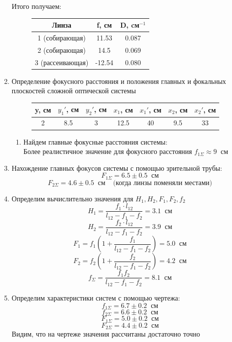 \documentclass[a4paper,12pt]{article}
\begin{document}
\begin{enumerate}
Итого получаем:
\begin{figure}[h!]
\centering
\begin{tabular}{|c|c|c|}
\hline 
Линза & f, см & D, cм$^{-1}$ \\ 
\hline 
1 (собирающая) & 11.53 & 0.087 \\ 
\hline 
2 (собирающая) & 14.5 & 0.069 \\ 
\hline 
3 (рассеивающая) & -12.54 & 0.080 \\ 
\hline 
\end{tabular} 
\end{figure}

\item Определение фокусного расстояния и положения главных и
фокальных плоскостей сложной оптической системы
\begin{figure}[h!]
\centering
\begin{tabular}{|c|c|c|c|c|c|c|}
\hline 
y, см & $y_1'$, см & $y_2'$, см & $x_1$, см & $x_1'$, см & $x_2$, см & $x_2'$, см \\ 
\hline 
2 & 8.5 & 3 & 12.5 & 40 & 9.5 & 33 \\ 
\hline 
\end{tabular} 
\end{figure}

\begin{enumerate}
\itemsep0em
\item Найдем главные фокусные расстояния системы:\\
Более реалистичное значение для фокусного расстояния
$f_{1\Sigma} \approx 9\;\;\text{см}$
\end{enumerate}
\item Нахождение главных фокусов системы с помощью зрительной трубы:
\[F_{1\Sigma}=6.5 \pm 0.5\;\;\text{см}\]
\[F_{2\Sigma} = 4.6\pm 0.5\;\;\text{см}\;\;\;\;\text{(когда линзы поменяли местами)}\]
\item Определим вычислительно значения для $H_1, H_2, F_1, F_2, f_2$
\[H_1 = \frac{f_1\cdot l_{12}}{l_{12} - f_1 - f_2} = 3.1\;\;\text{см}\]
\[H_2 = \frac{f_2\cdot l_{12}}{l_{12} - f_1 - f_2} = 3.9\;\;\text{см}\]
\[F_1 = f_1(1 + \frac{f_1}{l_{12} - f_1 - f_2}) = 5.0\;\;\text{см}\]
\[F_2 = f_2(1 + \frac{f_2}{l_{12} - f_1 - f_2}) = 4.2\;\;\text{см}\]
\[f_{\Sigma} = \frac{f_1f_2}{l_{12} - f_1-f_2} = 8.1 \;\;\text{см}\]
\item Определим характеристики систем с помощью чертежа:
\[f_{1\Sigma} = 6.7\pm 0.2\;\;\text{см}\]
\[f_{2\Sigma} = 6.6\pm 0.2\;\;\text{см}\]
\[F_{1\Sigma} = 5.0\pm 0.2\;\;\text{см}\]
\[F_{2\Sigma} = 4.4\pm 0.2\;\;\text{см}\]
Видим, что на чертеже значения рассчитаны достаточно точно
\end{enumerate}
\end{document}
